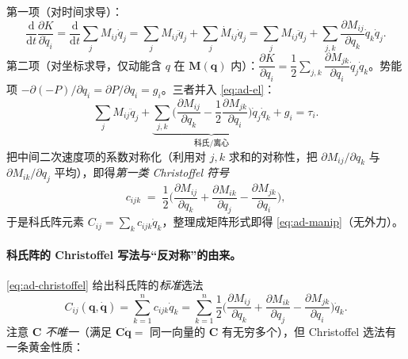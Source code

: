\begin{derivation}[从 Euler--Lagrange 凑出 $\mathbf{M}\ddot{\mathbf{q}}+\mathbf{C}\dot{\mathbf{q}}+\mathbf{g}=\boldsymbol{\tau}$]
第一项（对时间求导）：
\[
  \frac{\mathrm{d}}{\mathrm{d}t}\frac{\partial K}{\partial\dot{q}_i}=\frac{\mathrm{d}}{\mathrm{d}t}\sum_j M_{ij}\dot{q}_j=\sum_j M_{ij}\ddot{q}_j+\sum_j\dot{M}_{ij}\dot{q}_j=\sum_j M_{ij}\ddot{q}_j+\sum_{j,k}\frac{\partial M_{ij}}{\partial q_k}\dot{q}_k\dot{q}_j.
\]
第二项（对坐标求导，仅动能含 $q$ 在 $\mathbf{M}(\mathbf{q})$ 内）：$\dfrac{\partial K}{\partial q_i}=\dfrac12\sum_{j,k}\dfrac{\partial M_{jk}}{\partial q_i}\dot{q}_j\dot{q}_k$。势能项 $-\partial(-P)/\partial q_i=\partial P/\partial q_i=g_i$。三者并入 \cref{eq:ad-el}：
\[
  \sum_j M_{ij}\ddot{q}_j+\underbrace{\sum_{j,k}\Big(\frac{\partial M_{ij}}{\partial q_k}-\frac12\frac{\partial M_{jk}}{\partial q_i}\Big)\dot{q}_j\dot{q}_k}_{\text{科氏/离心}}+g_i=\tau_i.
\]
把中间二次速度项的系数对称化（利用对 $j,k$ 求和的对称性，把 $\partial M_{ij}/\partial q_k$ 与 $\partial M_{ik}/\partial q_j$ 平均），即得\emph{第一类 Christoffel 符号}
\begin{equation}
  c_{ijk}\;=\;\frac12\Big(\frac{\partial M_{ij}}{\partial q_k}+\frac{\partial M_{ik}}{\partial q_j}-\frac{\partial M_{jk}}{\partial q_i}\Big),
  \label{eq:ad-christoffel}
\end{equation}
于是科氏阵元素 $C_{ij}=\sum_k c_{ijk}\dot{q}_k$，整理成矩阵形式即得 \cref{eq:ad-manip}（无外力）。
\end{derivation}

\paragraph{科氏阵的 Christoffel 写法与“反对称”的由来。}
\cref{eq:ad-christoffel} 给出科氏阵的\emph{标准}选法
\begin{equation}
  C_{ij}(\mathbf{q},\dot{\mathbf{q}})=\sum_{k=1}^n c_{ijk}\dot{q}_k=\sum_{k=1}^n\frac12\Big(\frac{\partial M_{ij}}{\partial q_k}+\frac{\partial M_{ik}}{\partial q_j}-\frac{\partial M_{jk}}{\partial q_i}\Big)\dot{q}_k.
  \label{eq:ad-coriolis-matrix}
\end{equation}
注意 $\mathbf{C}$ \emph{不唯一}（满足 $\mathbf{C}\dot{\mathbf{q}}=$ 同一向量的 $\mathbf{C}$ 有无穷多个），但 Christoffel 选法有一条黄金性质：

